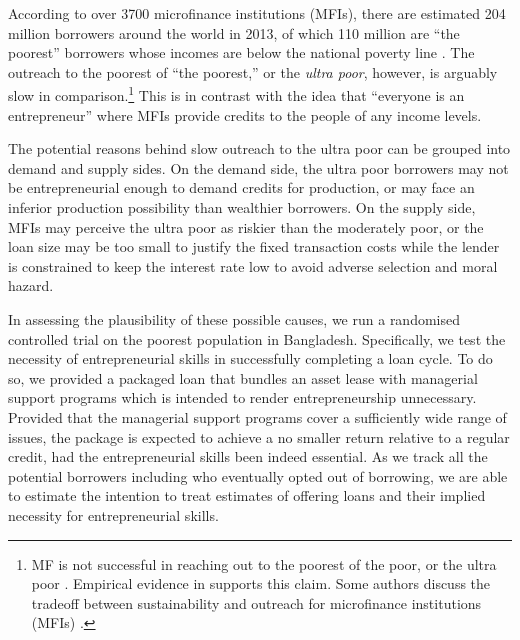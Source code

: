 	According to over 3700 microfinance institutions (MFIs), there are estimated 204 million borrowers around the world in 2013, of which 110 million are ``the poorest'' borrowers whose incomes are below the national poverty line \citep{MFGateway2015}. The outreach to the poorest of ``the poorest,'' or the \textit{ultra poor}, however, is arguably slow in comparison.\footnote{MF is not successful in reaching out to the poorest of the poor, or the ultra poor \citep[][]{Scully2004}. Empirical evidence in \citet{Yaron1994, Navajas2000, RahmanRazzaque2000, AghionMorduch2007} supports this claim. Some authors discuss the tradeoff between sustainability and outreach for microfinance institutions (MFIs) \citet{HermesLensink2011, HermesLensinkMeesters2011, Cull2011}. } This is in contrast with the idea that ``everyone is an entrepreneur'' where MFIs provide credits to the people of any income levels.

	The potential reasons behind slow outreach to the ultra poor can be grouped into demand and supply sides. On the demand side, the ultra poor borrowers may not be entrepreneurial enough to demand credits for production, or may face an inferior production possibility than wealthier borrowers. On the supply side, MFIs may perceive the ultra poor as riskier than the moderately poor, or the loan size may be too small to justify the fixed transaction costs while the lender is constrained to keep the interest rate low to avoid adverse selection and moral hazard. 

	In assessing the plausibility of these possible causes, we run a randomised controlled trial on the poorest population in Bangladesh. Specifically, we test the necessity of entrepreneurial skills in successfully completing a loan cycle. To do so, we provided a packaged loan that bundles an asset lease with managerial support programs which is intended to render entrepreneurship unnecessary. Provided that the managerial support programs cover a sufficiently wide range of issues, the package is expected to achieve a no smaller return relative to a regular credit, had the entrepreneurial skills been indeed essential. As we track all the potential borrowers including who eventually opted out of borrowing, we are able to estimate the intention to treat estimates of offering loans and their implied necessity for entrepreneurial skills. 
	
